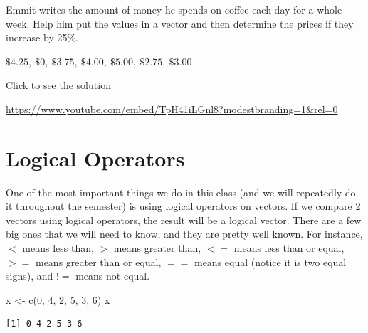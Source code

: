 \documentclass[
  letterpaper,
  DIV=11,
  numbers=noendperiod]{scrreprt}
\newenvironment{Shaded}{\begin{snugshade}}{\end{snugshade}}
\newcommand{\DecValTok}[1]{\textcolor[rgb]{0.68,0.00,0.00}{#1}}
\newcommand{\FunctionTok}[1]{\textcolor[rgb]{0.28,0.35,0.67}{#1}}
\newcommand{\NormalTok}[1]{\textcolor[rgb]{0.00,0.23,0.31}{#1}}
\newcommand{\OtherTok}[1]{\textcolor[rgb]{0.00,0.23,0.31}{#1}}
\begin{document}
\begin{tcolorbox}[enhanced jigsaw, colframe=quarto-callout-tip-color-frame, colback=white, breakable, rightrule=.15mm, title=\textcolor{quarto-callout-tip-color}{\faLightbulb}\hspace{0.5em}{Try it Out}, bottomtitle=1mm, toptitle=1mm, titlerule=0mm, left=2mm, coltitle=black, colbacktitle=quarto-callout-tip-color!10!white, leftrule=.75mm, opacitybacktitle=0.6, bottomrule=.15mm, opacityback=0, arc=.35mm, toprule=.15mm]

Emmit writes the amount of money he spends on coffee each day for a
whole week. Help him put the values in a vector and then determine the
prices if they increase by 25\%.

\(\$4.25,\ \$0,\ \$3.75,\ \$4.00,\ \$5.00,\ \$2.75,\ \$3.00\)

Click to see the solution

\url{https://www.youtube.com/embed/TpH41iLGnl8?modestbranding=1&rel=0}

\end{tcolorbox}

\section{Logical Operators}\label{logical-operators}

One of the most important things we do in this class (and we will
repeatedly do it throughout the semester) is using logical operators on
vectors. If we compare 2 vectors using logical operators, the result
will be a logical vector. There are a few big ones that we will need to
know, and they are pretty well known. For instance, \(<\) means less
than, \(>\) means greater than, \(<=\) means less than or equal, \(>=\)
means greater than or equal, \(==\) means equal (notice it is two equal
signs), and \(!=\) means not equal.

\begin{Shaded}
\begin{Highlighting}[]
\NormalTok{x }\OtherTok{\textless{}{-}} \FunctionTok{c}\NormalTok{(}\DecValTok{0}\NormalTok{, }\DecValTok{4}\NormalTok{, }\DecValTok{2}\NormalTok{, }\DecValTok{5}\NormalTok{, }\DecValTok{3}\NormalTok{, }\DecValTok{6}\NormalTok{)}
\NormalTok{x}
\end{Highlighting}
\end{Shaded}

\begin{verbatim}
[1] 0 4 2 5 3 6
\end{verbatim}
\end{document}
